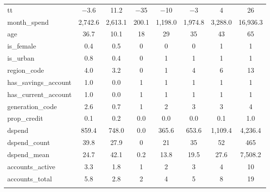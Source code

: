 \begin{table}[H]
\begin{tabular}{@{\extracolsep{5pt}}lccccccc}
tt & $-$3.6 & 11.2 & $-$35 & $-$10 & $-$3 & 4 & 26 \\ 
month\_spend & 2,742.6 & 2,613.1 & 200.1 & 1,198.0 & 1,974.8 & 3,288.0 & 16,936.3 \\ 
age & 36.7 & 10.1 & 18 & 29 & 35 & 43 & 65 \\ 
is\_female & 0.4 & 0.5 & 0 & 0 & 0 & 1 & 1 \\ 
is\_urban & 0.8 & 0.4 & 0 & 1 & 1 & 1 & 1 \\ 
region\_code & 4.0 & 3.2 & 0 & 1 & 4 & 6 & 13 \\ 
has\_savings\_account & 1.0 & 0.0 & 1 & 1 & 1 & 1 & 1 \\ 
has\_current\_account & 1.0 & 0.0 & 1 & 1 & 1 & 1 & 1 \\ 
generation\_code & 2.6 & 0.7 & 1 & 2 & 3 & 3 & 4 \\ 
prop\_credit & 0.1 & 0.2 & 0.0 & 0.0 & 0.0 & 0.1 & 1.0 \\ 
dspend & 859.4 & 748.0 & 0.0 & 365.6 & 653.6 & 1,109.4 & 4,236.4 \\ 
dspend\_count & 39.8 & 27.9 & 0 & 21 & 35 & 52 & 465 \\ 
dspend\_mean & 24.7 & 42.1 & 0.2 & 13.8 & 19.5 & 27.6 & 7,508.2 \\ 
accounts\_active & 3.3 & 1.8 & 1 & 2 & 3 & 4 & 10 \\ 
accounts\_total & 5.8 & 2.8 & 2 & 4 & 5 & 8 & 19 \\ 
\hline \\[-1.8ex] 
\end{tabular} 
\end{table} 
